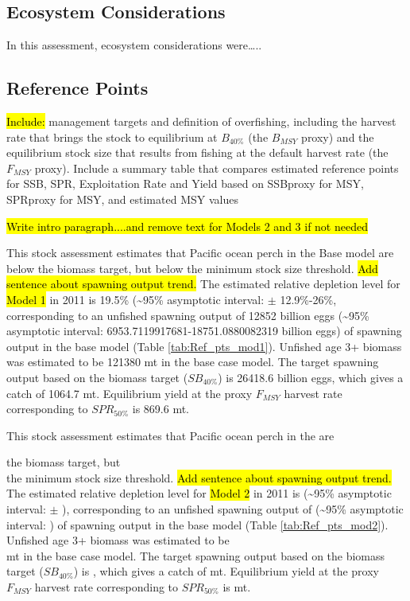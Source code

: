 \documentclass[12pt,]{article}
\begin{document}
\FloatBarrier

\subsection*{Ecosystem Considerations}\label{ecosystem-considerations}

In this assessment, ecosystem considerations were\ldots{}..

\subsection*{Reference Points}\label{reference-points}

\hl{Include:} management targets and definition of overfishing,
including the harvest rate that brings the stock to equilibrium at
\(B_{40\%}\) (the \(B_{MSY}\) proxy) and the equilibrium stock size that
results from fishing at the default harvest rate (the \(F_{MSY}\)
proxy). Include a summary table that compares estimated reference points
for SSB, SPR, Exploitation Rate and Yield based on SSBproxy for MSY,
SPRproxy for MSY, and estimated MSY values

\hl{Write intro paragraph....and remove text for Models 2 and 3 if not needed}

This stock assessment estimates that Pacific ocean perch in the Base
model are below the biomass target, but below the minimum stock size
threshold. \hl{Add sentence about spawning output trend.} The estimated
relative depletion level for \hl{Model 1} in 2011 is 19.5\%
(\textasciitilde{}95\% asymptotic interval: \(\pm\) 12.9\%-26\%,
corresponding to an unfished spawning output of 12852 billion eggs
(\textasciitilde{}95\% asymptotic interval:
6953.7119917681-18751.0880082319 billion eggs) of spawning output in the
base model (Table \ref{tab:Ref_pts_mod1}). Unfished age 3+ biomass was
estimated to be 121380 mt in the base case model. The target spawning
output based on the biomass target (\(SB_{40\%}\)) is 26418.6 billion
eggs, which gives a catch of 1064.7 mt. Equilibrium yield at the proxy
\(F_{MSY}\) harvest rate corresponding to \(SPR_{50\%}\) is 869.6 mt.

This stock assessment estimates that Pacific ocean perch in the are

the biomass target, but\\
the minimum stock size threshold.
\hl{Add sentence about spawning output trend.} The estimated relative
depletion level for \hl{Model 2} in 2011 is (\textasciitilde{}95\%
asymptotic interval: \(\pm\) ), corresponding to an unfished spawning
output of (\textasciitilde{}95\% asymptotic interval: ) of spawning
output in the base model (Table \ref{tab:Ref_pts_mod2}). Unfished age 3+
biomass was estimated to be\\
mt in the base case model. The target spawning output based on the
biomass target (\(SB_{40\%}\)) is , which gives a catch of mt.
Equilibrium yield at the proxy \(F_{MSY}\) harvest rate corresponding to
\(SPR_{50\%}\) is mt.
\end{document}

